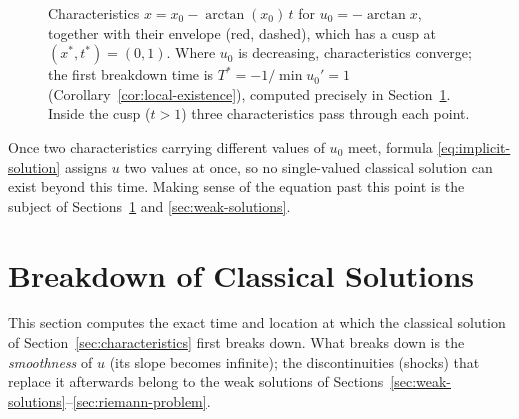 \begin{figure}[h]
\centering
{}
\caption{Characteristics $x=x_0-\arctan(x_0)\,t$ for $u_0=-\arctan x$,
together with their envelope (red, dashed), which has a cusp at
$(x^*,t^*)=(0,1)$. Where $u_0$ is decreasing, characteristics converge;
the first breakdown time is $T^*=-1/\min u_0'=1$
(Corollary~\ref{cor:local-existence}), computed precisely in
Section~\ref{sec:shock-formation}. Inside the cusp ($t>1$) three
characteristics pass through each point.}
\label{fig:characteristics}
\end{figure}

\begin{remark}
\label{rem:beyond-T}
Once two characteristics carrying different values of $u_0$ meet, formula
\eqref{eq:implicit-solution} assigns $u$ two values at once, so no
single-valued classical solution can exist beyond this time. Making sense
of the equation past this point is the subject of
Sections~\ref{sec:shock-formation} and \ref{sec:weak-solutions}.
\end{remark}


\section{Breakdown of Classical Solutions}
\label{sec:shock-formation}

This section computes the exact time and location at which the classical
solution of Section~\ref{sec:characteristics} first breaks down. What
breaks down is the \emph{smoothness} of $u$ (its slope becomes infinite);
the discontinuities (shocks) that replace it afterwards belong to the weak
solutions of Sections~\ref{sec:weak-solutions}--\ref{sec:riemann-problem}.

